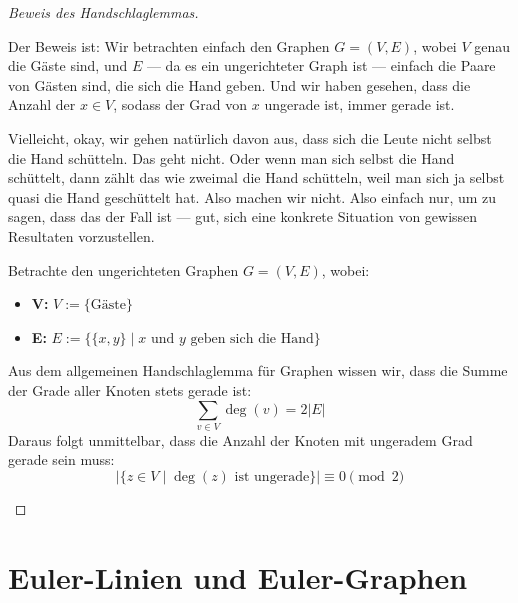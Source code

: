 \begin{math-stroke}
\end{math-stroke}

\begin{proof}[Beweis des Handschlaglemmas]
\begin{spoken-clean}[00:01:58 - 00:03:38]
Der Beweis ist:  Wir betrachten einfach den Graphen $G = (V, E)$, wobei $V$ genau die Gäste sind, und $E$ --- da es ein ungerichteter Graph ist --- einfach die Paare von Gästen sind, die sich die Hand geben. Und wir haben gesehen, dass die Anzahl der $x \in V$, sodass der Grad von $x$ ungerade ist, immer gerade ist.

Vielleicht, okay, wir gehen natürlich davon aus, dass sich die Leute nicht selbst die Hand schütteln. Das geht nicht. Oder wenn man sich selbst die Hand schüttelt, dann zählt das wie zweimal die Hand schütteln, weil man sich ja selbst quasi die Hand geschüttelt hat. Also machen wir nicht. Also einfach nur, um zu sagen, dass das der Fall ist --- gut, sich eine konkrete Situation von gewissen Resultaten vorzustellen.
\end{spoken-clean}

\begin{math-stroke}
Betrachte den ungerichteten Graphen $G = (V, E)$, wobei:
\begin{itemize}
    \item \textbf{V:} $V := \{\text{Gäste}\}$
    \item \textbf{E:} $E := \{\{x, y\} \mid x \text{ und } y \text{ geben sich die Hand}\}$
\end{itemize}
Aus dem allgemeinen Handschlaglemma für Graphen wissen wir, dass die Summe der Grade aller Knoten stets gerade ist:
\[
\sum_{v \in V} \deg(v) = 2|E|
\]
Daraus folgt unmittelbar, dass die Anzahl der Knoten mit ungeradem Grad gerade sein muss:
\[
\left| \bigl\{ z \in V \;\big|\; \deg(z) \text{ ist ungerade} \bigr\} \right| \equiv 0 \pmod 2
\]
\end{math-stroke}
\end{proof}

\section{Euler-Linien und Euler-Graphen}

